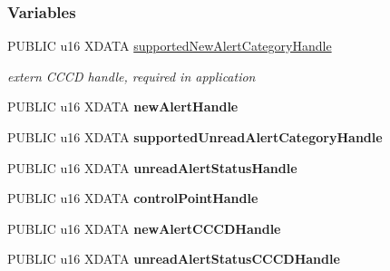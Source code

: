 \subsubsection*{Variables}
\begin{DoxyCompactItemize}
\item 
P\+U\+B\+L\+IC u16 X\+D\+A\+TA \hyperlink{group___b_l_e___a_n_s_ga4b0c0b3b45cbdd1a0d61c07c16ae60bb}{supported\+New\+Alert\+Category\+Handle}\hypertarget{group___b_l_e___a_n_s_ga4b0c0b3b45cbdd1a0d61c07c16ae60bb}{}\label{group___b_l_e___a_n_s_ga4b0c0b3b45cbdd1a0d61c07c16ae60bb}

\begin{DoxyCompactList}\small\item\em extern C\+C\+CD handle, required in application \end{DoxyCompactList}\item 
P\+U\+B\+L\+IC u16 X\+D\+A\+TA {\bfseries new\+Alert\+Handle}\hypertarget{group___b_l_e___a_n_s_ga6a0de9cccc0e2d24d874850581ef0c4f}{}\label{group___b_l_e___a_n_s_ga6a0de9cccc0e2d24d874850581ef0c4f}

\item 
P\+U\+B\+L\+IC u16 X\+D\+A\+TA {\bfseries supported\+Unread\+Alert\+Category\+Handle}\hypertarget{group___b_l_e___a_n_s_ga4453e3b43157e1562894ff1eff371b69}{}\label{group___b_l_e___a_n_s_ga4453e3b43157e1562894ff1eff371b69}

\item 
P\+U\+B\+L\+IC u16 X\+D\+A\+TA {\bfseries unread\+Alert\+Status\+Handle}\hypertarget{group___b_l_e___a_n_s_ga9dbf2d982f37a92f9d9c5f31d12e20c3}{}\label{group___b_l_e___a_n_s_ga9dbf2d982f37a92f9d9c5f31d12e20c3}

\item 
P\+U\+B\+L\+IC u16 X\+D\+A\+TA {\bfseries control\+Point\+Handle}\hypertarget{group___b_l_e___a_n_s_gad13b440a753b04ec7165271e53c5de9c}{}\label{group___b_l_e___a_n_s_gad13b440a753b04ec7165271e53c5de9c}

\item 
P\+U\+B\+L\+IC u16 X\+D\+A\+TA {\bfseries new\+Alert\+C\+C\+C\+D\+Handle}\hypertarget{group___b_l_e___a_n_s_ga2025335ca6c1c199dc5d22ffda8eb3c0}{}\label{group___b_l_e___a_n_s_ga2025335ca6c1c199dc5d22ffda8eb3c0}

\item 
P\+U\+B\+L\+IC u16 X\+D\+A\+TA {\bfseries unread\+Alert\+Status\+C\+C\+C\+D\+Handle}\hypertarget{group___b_l_e___a_n_s_ga066a4d33027fefae4fa6ee5c9c9384a3}{}\label{group___b_l_e___a_n_s_ga066a4d33027fefae4fa6ee5c9c9384a3}

\end{DoxyCompactItemize}


